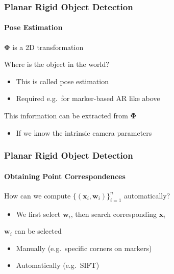 \documentclass[xetex,professionalfont]{beamer}
\renewcommand{\vec}[1]{\ensuremath{\mathbf{#1}}}
\newcommand{\vw}{\vec{w}}
\newcommand{\vx}{\vec{x}}
\renewcommand\emph[1]{\textcolor{tuwcvl_inf_red}{#1}}
\begin{document}
\begin{frame}
\frametitle{Planar Rigid Object Detection}
\framesubtitle{Pose Estimation}

$\boldsymbol{\Phi}$ is a 2D transformation

\bigskip
Where is the object in the world? %
\begin{itemize}
    \item This is called \emph{pose estimation}
    \item Required e.g.\ for marker-based AR like above
\end{itemize}

\bigskip
This information can be extracted from $\boldsymbol{\Phi}$
\begin{itemize}
    \item If we know the intrinsic camera parameters %
\end{itemize}

\end{frame}


\begin{frame}
\frametitle{Planar Rigid Object Detection}
\framesubtitle{Obtaining Point Correspondences}

How can we compute $\{(\vx_i,\vw_i)\}_{i=1}^n$ automatically?
\begin{itemize}
    \item We first select $\vw_i$, then search corresponding $\vx_i$
\end{itemize}

\bigskip
$\vw_i$ can be selected
\begin{itemize}
    \item Manually (e.g.\ specific corners on markers)
    \item Automatically (e.g.\ SIFT)
\end{itemize}

\end{frame}

\end{document}
